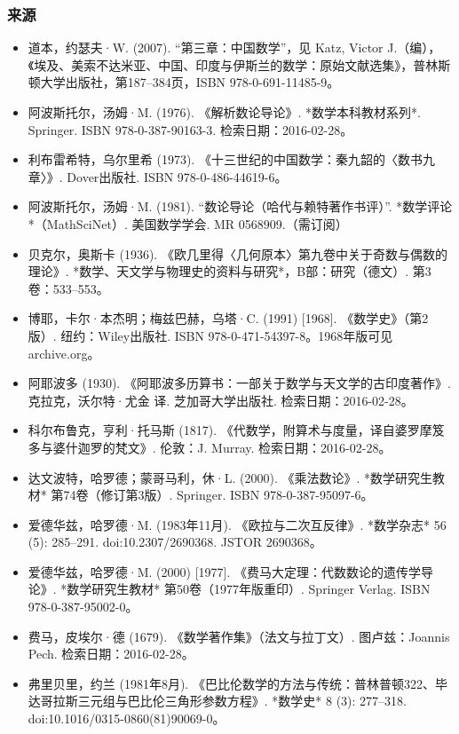 \subsubsection{来源}
\begin{itemize}
\item 道本，约瑟夫·W. (2007). “第三章：中国数学”，见 Katz, Victor J.（编），《埃及、美索不达米亚、中国、印度与伊斯兰的数学：原始文献选集》，普林斯顿大学出版社，第187–384页，ISBN 978-0-691-11485-9。
\item 阿波斯托尔，汤姆·M. (1976). 《解析数论导论》. *数学本科教材系列*. Springer. ISBN 978-0-387-90163-3. 检索日期：2016-02-28。
\item 利布雷希特，乌尔里希 (1973). 《十三世纪的中国数学：秦九韶的〈数书九章〉》. Dover出版社. ISBN 978-0-486-44619-6。
\item 阿波斯托尔，汤姆·M. (1981). “数论导论（哈代与赖特著作书评）”. *数学评论*（MathSciNet）. 美国数学学会. MR 0568909.（需订阅）
\item 贝克尔，奥斯卡 (1936). 《欧几里得〈几何原本〉第九卷中关于奇数与偶数的理论》. *数学、天文学与物理史的资料与研究*，B部：研究（德文）. 第3卷：533–553。
\item 博耶，卡尔·本杰明；梅兹巴赫，乌塔·C. (1991) [1968]. 《数学史》（第2版）. 纽约：Wiley出版社. ISBN 978-0-471-54397-8。1968年版可见 archive.org。
\item 阿耶波多 (1930). 《阿耶波多历算书：一部关于数学与天文学的古印度著作》. 克拉克，沃尔特·尤金 译. 芝加哥大学出版社. 检索日期：2016-02-28。
\item 科尔布鲁克，亨利·托马斯 (1817). 《代数学，附算术与度量，译自婆罗摩笈多与婆什迦罗的梵文》. 伦敦：J. Murray. 检索日期：2016-02-28。
\item 达文波特，哈罗德；蒙哥马利，休·L. (2000). 《乘法数论》. *数学研究生教材* 第74卷（修订第3版）. Springer. ISBN 978-0-387-95097-6。
\item 爱德华兹，哈罗德·M. (1983年11月). 《欧拉与二次互反律》. *数学杂志* 56 (5): 285–291. doi:10.2307/2690368. JSTOR 2690368。
\item 爱德华兹，哈罗德·M. (2000) [1977]. 《费马大定理：代数数论的遗传学导论》. *数学研究生教材* 第50卷（1977年版重印）. Springer Verlag. ISBN 978-0-387-95002-0。
\item 费马，皮埃尔·德 (1679). 《数学著作集》（法文与拉丁文）. 图卢兹：Joannis Pech. 检索日期：2016-02-28。
\item 弗里贝里，约兰 (1981年8月). 《巴比伦数学的方法与传统：普林普顿322、毕达哥拉斯三元组与巴比伦三角形参数方程》. *数学史* 8 (3): 277–318. doi:10.1016/0315-0860(81)90069-0。

\end{itemize}
